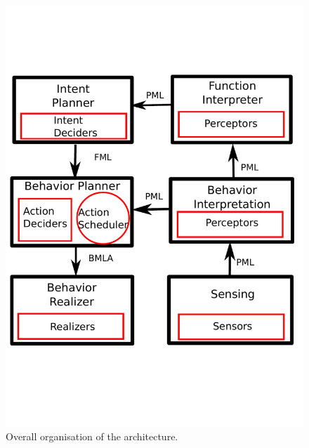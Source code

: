 \begin{figure}
  \centering
  \includegraphics[width=\linewidth]{figure/impl_schema.pdf}
  \caption{Overall organisation of the architecture.}
  \label{overall_archi}
\end{figure}

